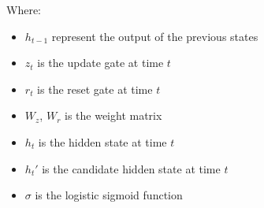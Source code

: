 \documentclass{ieeeojies}
\begin{document}
Where:\\
    \begin{itemize}
        \item \(h_{t-1}\) represent the output of the previous states
        \item \(z_t\) is the update gate at time \(t\)
        \item \(r_t\) is the reset gate at time \(t\)
        \item \(W_z\), \(W_r\) is the weight matrix
        \item \(h_t\) is the hidden state at time \(t\)
        \item \(h_t'\) is the candidate hidden state at time \(t\)
        \item \(\sigma\) is the logistic sigmoid function \cite{gru_equation} \\
    \end{itemize}\\
\end{document}
